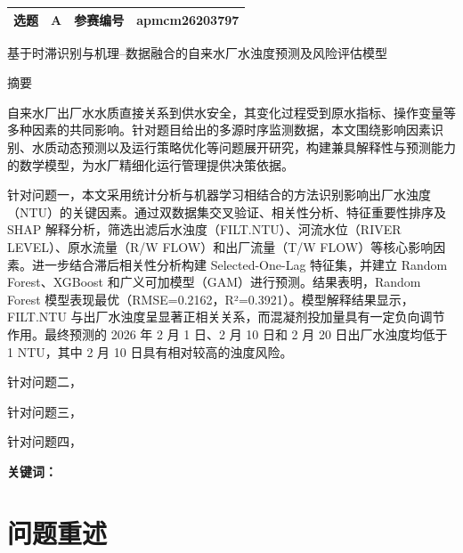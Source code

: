 \documentclass[UTF8,zihao=-4]{ctexart}
\newcommand{\teamid}{apmcm26203797} %
\newcommand{\problemid}{A}
\newcommand{\papertitle}{基于时滞识别与机理--数据融合的自来水厂水浊度预测及风险评估模型}
\begin{document}

\begin{center}
\begin{tabularx}{0.95\textwidth}{|Y|Y|Y|Y|}
\hline
选题 & \problemid & 参赛编号 & \teamid \\
\hline
\end{tabularx}
\end{center}

\vspace{1.2em}

\begin{center}
{\heiti{}\papertitle}
\end{center}

\vspace{1em}

\begin{center}
{\heiti{} 摘要}
\end{center}

自来水厂出厂水水质直接关系到供水安全，其变化过程受到原水指标、操作变量等多种因素的共同影响。针对题目给出的多源时序监测数据，本文围绕影响因素识别、水质动态预测以及运行策略优化等问题展开研究，构建兼具解释性与预测能力的数学模型，为水厂精细化运行管理提供决策依据。

针对问题一，本文采用统计分析与机器学习相结合的方法识别影响出厂水浊度（NTU）的关键因素。通过双数据集交叉验证、相关性分析、特征重要性排序及 SHAP 解释分析，筛选出滤后水浊度（FILT.NTU）、河流水位（RIVER LEVEL）、原水流量（R/W FLOW）和出厂流量（T/W FLOW）等核心影响因素。进一步结合滞后相关性分析构建 Selected-One-Lag 特征集，并建立 Random Forest、XGBoost 和广义可加模型（GAM）进行预测。结果表明，Random Forest 模型表现最优（RMSE=0.2162，R²=0.3921）。模型解释结果显示，FILT.NTU 与出厂水浊度呈显著正相关关系，而混凝剂投加量具有一定负向调节作用。最终预测的 2026 年 2 月 1 日、2 月 10 日和 2 月 20 日出厂水浊度均低于 1 NTU，其中 2 月 10 日具有相对较高的浊度风险。

针对问题二，

针对问题三，

针对问题四，


\vspace{1em}
\noindent\textbf{关键词：} 

\newpage


\section{问题重述}
\end{document}
